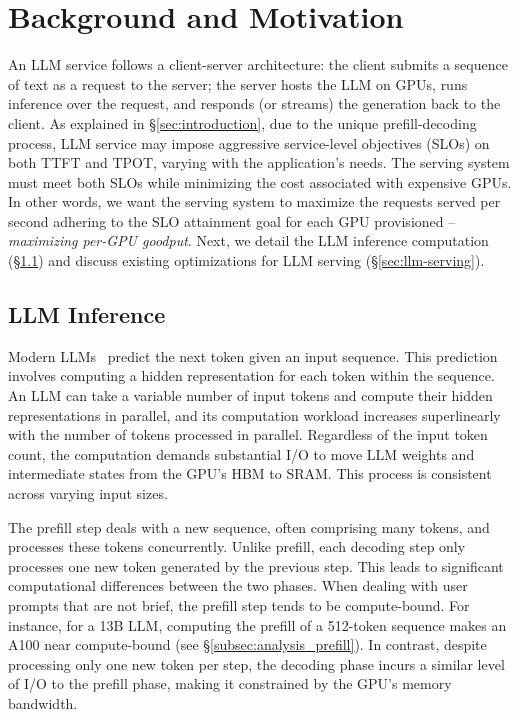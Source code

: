 \section{Background and Motivation}
\label{sec:background}


An LLM service follows a client-server architecture: the client submits a sequence of text as a request to the server; the server hosts the LLM on GPUs, runs inference over the request, and responds (or streams) the generation back to the client. As explained in \S\ref{sec:introduction}, due to the unique prefill-decoding process, LLM service may impose aggressive service-level objectives (SLOs) on both TTFT and TPOT, varying with the application's needs. The serving system must meet both SLOs while minimizing the cost associated with expensive GPUs. In other words, we want the serving system to maximize the requests served per second adhering to the SLO attainment goal for each GPU provisioned -- \emph{maximizing per-GPU goodput}.
Next, we detail the LLM inference computation (\S\ref{sec:llm-inference}) and discuss existing optimizations for LLM serving (\S\ref{sec:llm-serving}).

\subsection{LLM Inference}
\label{sec:llm-inference}

Modern LLMs~\cite{openai2023gpt4,touvron2023llama} predict the next token given an input sequence. This prediction involves computing a hidden representation for each token within the sequence. An LLM can take a variable number of input tokens and compute their hidden representations in parallel, and its computation workload increases superlinearly with the number of tokens processed in parallel. Regardless of the input token count, the computation demands substantial I/O to move LLM weights and intermediate states from the GPU's HBM to SRAM. This process is consistent across varying input sizes.

The prefill step deals with a new sequence, often comprising many tokens, and processes these tokens concurrently. Unlike prefill, each decoding step only processes one new token generated by the previous step.
This leads to significant computational differences between the two phases.
When dealing with user prompts that are not brief, the prefill step tends to be compute-bound. For instance, for a 13B LLM, computing the prefill of a 512-token sequence makes an A100 near compute-bound (see \S\ref{subsec:analysis_prefill}). In contrast, despite processing only one new token per step, the decoding phase incurs a similar level of I/O to the prefill phase, making it constrained by the GPU's memory bandwidth.

